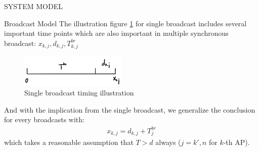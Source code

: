 \documentclass[10pt, conference, letterpaper]{IEEEtran}
\begin{document}
\begin{section}{SYSTEM MODEL}
\begin{subsection}{Broadcast Model}
            The illustration figure \ref{fig:brd} for single broadcast includes several important time points which are also important in multiple synchronous broadcast: $x_{k,j}, d_{k,j}, T^{br}_{k,j}$
            \begin{figure}[ht]
                \centering
                \includegraphics[width=0.45\textwidth]{single-broadcast.png}
                \caption{Single broadcast timing illustration}
                \label{fig:brd}
            \end{figure}
            And with the implication from the single broadcast, we generalize the conclusion for every broadcasts with:
            \begin{align}
                x_{k,j} = d_{k,j} + T^{br}_{j}
            \end{align}
            which takes a reasonable assumption that $T>d$ always ($j=k',n$ for $k$-th AP).
        \end{subsection}
    \end{section}
\end{document}

